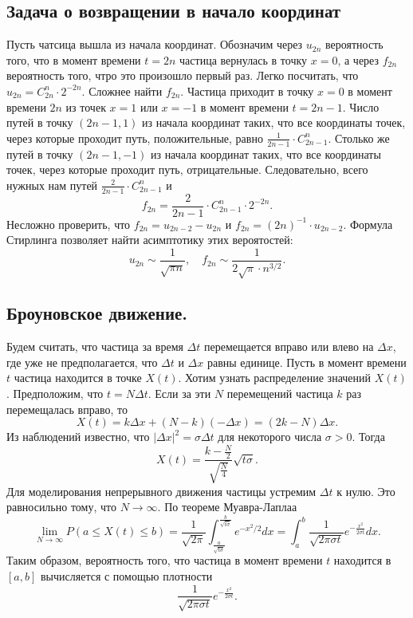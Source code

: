\subsection{Задача о возвращении в начало координат}
Пусть чатсица вышла из начала координат. Обозначим через $u_{2n}$ вероятность того, что в момент времени $t = 2n$ частица вернулась в точку $x = 0$, а через $f_{2n}$ вероятность того, чтро это произошло первый раз.
\newline
Легко посчитать, что $u_{2n} = C_{2n}^n \cdot 2^{-2n}$. Сложнее найти $f_{2n}$. Частица приходит в точку $x = 0$ в момент времени $2n$ из точек $x = 1$ или $x = -1$ в момент времени $t = 2n - 1$. Число путей в точку $(2n-1, 1)$ из начала координат таких, что все координаты точек, через которые проходит путь, положительные, равно $\frac{1}{2n -1} \cdot C_{2n-1}^n$. Столько же путей в точку $(2n-1, -1)$ из начала координат таких, что все координаты точек, через которые проходит путь, отрицательные. Следовательно, всего нужных нам путей $\frac{2}{2n-1} \cdot C_{2n-1}^n$ и
\[
    f_{2n} = \frac{2}{2n - 1} \cdot C_{2n-1}^n \cdot 2^{-2n}.
\]
Несложно проверить, что $f_{2n} = u_{2n-2} - u_{2n}$ и $f_{2n} = (2n)^{-1} \cdot u_{2n-2}$. Формула Стирлинга позволяет найти асимптотику этих вероятостей:
\[
    u_{2n} \sim \frac{1}{\sqrt{\pi n}},
    \quad
    f_{2n} \sim \frac{1}{2 \sqrt{\pi} \cdot n^{3/2}}.
\]

\subsection{Броуновское движение.}
Будем считать, что частица за время $\Delta t$ перемещается вправо или влево на $\Delta x$, где уже не предполагается, что $\Delta t$ и $\Delta x$ равны единице. Пусть в момент времени $t$ частица находится в точке $X(t)$. Хотим узнать распределение значений $X(t)$. Предположим, что $t = N \Delta t$. Если за эти $N$ перемещений частица $k$ раз перемещалась вправо, то
\[
    X(t) = k \Delta x + (N - k)(- \Delta x) = (2k - N) \Delta x.
\]
Из наблюдений известно, что $|\Delta x|^2 = \sigma \Delta t$ для некоторого числа $\sigma > 0$. Тогда
\[
    X(t) = \frac{k - \frac{N}{2}}{\sqrt{\frac{N}{4}}} \sqrt{t \sigma}.
\]
Для моделирования непрерывного движения частицы устремим $\Delta t$ к нулю. Это равносильно тому, что $N \to \infty$. По теореме Муавра-Лаплаа
\[
    \lim_{N \to \infty} P \left(
        a \leqslant X(t) \leqslant b
    \right) =
    \frac{1}{\sqrt{2\pi}} \int_{\frac{a}{\sqrt{t \sigma}}}^{\frac{b}{\sqrt{t \sigma}}} e^{-x^2 / 2} dx = 
    \int_a^b \frac{1}{\sqrt{2 \pi \sigma t}} e^{-\frac{x^2}{2 \sigma t}} dx.
\]
Таким образом, вероятность того, что частица в момент времени $t$ находится в $[a,b]$ вычисляется с помощью плотности $$\frac{1}{\sqrt{2\pi \sigma t}} e^{-\frac{x^2}{2 \sigma t}}.$$